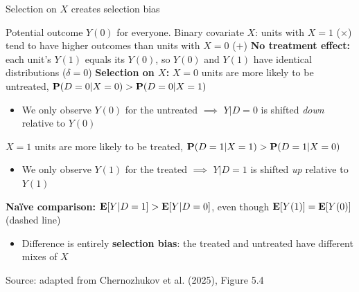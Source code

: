 \documentclass[compress, 8pt]{beamer}
\begin{document}
\begin{frame}{Selection on $X$ creates selection bias}

\begin{figure}
\end{figure}

\begin{overprint}
Potential outcome $Y(0)$ for everyone. Binary covariate $X$: units with $X = 1$ ({\color{MainBlue}$\times$}) tend to have higher outcomes than units with $X = 0$ ({\color{Orange}$+$})
\textbf{No treatment effect:} each unit's $Y(1)$ equals its $Y(0)$, so $Y(0)$ and $Y(1)$ have identical distributions ($\delta = 0$)
\textbf{Selection on $X$:} $X = 0$ units are more likely to be untreated, $\mathbf{P}(D = 0 \vert X = 0) > \mathbf{P}(D = 0 \vert X = 1)$
\begin{itemize}
    \item We only observe $Y(0)$ for the untreated $\implies$ $Y \vert D = 0$ is shifted \emph{down} relative to $Y(0)$
\end{itemize}
$X = 1$ units are more likely to be treated, $\mathbf{P}(D = 1 \vert X = 1) > \mathbf{P}(D = 1 \vert X = 0)$
\begin{itemize}
    \item We only observe $Y(1)$ for the treated $\implies$ $Y \vert D = 1$ is shifted \emph{up} relative to $Y(1)$
\end{itemize}
\textbf{\textcolor{HunterPurple}{Na{\"i}ve comparison:}} $\mathbf{E} [Y \vert D = 1] > \mathbf{E} [Y \vert D = 0]$, even though $\mathbf{E} [Y(1)] = \mathbf{E} [Y(0)]$ (dashed line)
\begin{itemize}
    \item Difference is entirely \textbf{selection bias}: the treated and untreated have different mixes of $X$
\end{itemize}
\end{overprint}

\vspace{1ex}
{\footnotesize Source: adapted from Chernozhukov et al. (2025), Figure 5.4}
\end{frame}
\end{document}
